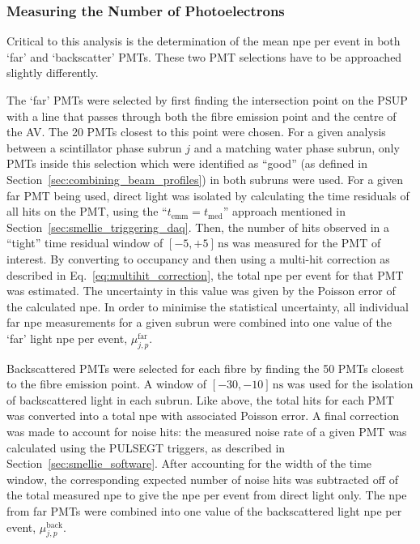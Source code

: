 \subsubsection{Measuring the Number of Photoelectrons}
Critical to this analysis is the determination of the mean npe per event in both `far' and `backscatter' PMTs. These two PMT selections have to be approached slightly differently.

The `far' PMTs were selected by first finding the intersection point on the PSUP with a line that passes through both the fibre emission point and the centre of the AV. The 20 PMTs closest to this point were chosen. For a given analysis between a scintillator phase subrun $j$ and a matching water phase subrun, only PMTs inside this selection which were identified as ``good'' (as defined in Section~\ref{sec:combining_beam_profiles}) in both subruns were used. For a given far PMT being used, direct light was isolated by calculating the time residuals of all hits on the PMT, using the ``$t_{\mathrm{emm}} = t_{\mathrm{med}}$'' approach mentioned in Section~\ref{sec:smellie_triggering_daq}. Then, the number of hits observed in a ``tight'' time residual window of $[-5,+5]\,\si{\ns}$ was measured for the PMT of interest. By converting to occupancy and then using a multi-hit correction as described in Eq.~\ref{eq:multihit_correction}, the total npe per event for that PMT was estimated. The uncertainty in this value was given by the Poisson error of the calculated npe. In order to minimise the statistical uncertainty, all individual far npe measurements for a given subrun were combined into one value of the `far' light npe per event, $\mu_{j,p}^{\mathrm{far}}$.

Backscattered PMTs were selected for each fibre by finding the 50 PMTs closest to the fibre emission point. A \tres{} window of $[-30,-10]\,\si{\ns}$ was used for the isolation of backscattered light in each subrun. Like above, the total hits for each PMT was converted into a total npe with associated Poisson error. A final correction was made to account for noise hits: the measured noise rate of a given PMT was calculated using the PULSEGT triggers, as described in Section~\ref{sec:smellie_software}. After accounting for the width of the time window, the corresponding expected number of noise hits was subtracted off of the total measured npe to give the npe per event from direct light only. The npe from far PMTs were combined into one value of the backscattered light npe per event, $\mu_{j,p}^{\mathrm{back}}$. 

